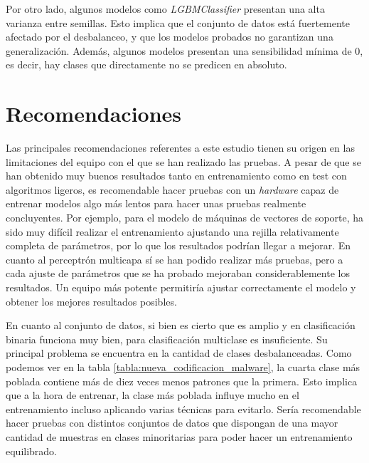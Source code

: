 \vspace{1em}

Por otro lado, algunos modelos como \textit{LGBMClassifier} presentan una alta varianza entre semillas. Esto implica que el conjunto de datos está fuertemente afectado por el desbalanceo, y que los modelos probados no garantizan una generalización. Además, algunos modelos presentan una sensibilidad mínima de 0, es decir, hay clases que directamente no se predicen en absoluto.

\section{Recomendaciones}
\label{sec:recomendaciones}

Las principales recomendaciones referentes a este estudio tienen su origen en las limitaciones del equipo con el que se han realizado las pruebas. A pesar de que se han obtenido muy buenos resultados tanto en entrenamiento como en test con algoritmos ligeros, es recomendable hacer pruebas con un \textit{hardware} capaz de entrenar modelos algo más lentos para hacer unas pruebas realmente concluyentes. Por ejemplo, para el modelo de máquinas de vectores de soporte, ha sido muy difícil realizar el entrenamiento ajustando una rejilla relativamente completa de parámetros, por lo que los resultados podrían llegar a mejorar. En cuanto al perceptrón multicapa sí se han podido realizar más pruebas, pero a cada ajuste de parámetros que se ha probado mejoraban considerablemente los resultados. Un equipo más potente permitiría ajustar correctamente el modelo y obtener los mejores resultados posibles.

\vspace{1em}

En cuanto al conjunto de datos, si bien es cierto que es amplio y en clasificación binaria funciona muy bien, para clasificación multiclase es insuficiente. Su principal problema se encuentra en la cantidad de clases desbalanceadas. Como podemos ver en la tabla \ref{tabla:nueva_codificacion_malware}, la cuarta clase más poblada contiene más de diez veces menos patrones que la primera. Esto implica que a la hora de entrenar, la clase más poblada influye mucho en el entrenamiento incluso aplicando varias técnicas para evitarlo. Sería recomendable hacer pruebas con distintos conjuntos de datos que dispongan de una mayor cantidad de muestras en clases minoritarias para poder hacer un entrenamiento equilibrado.
